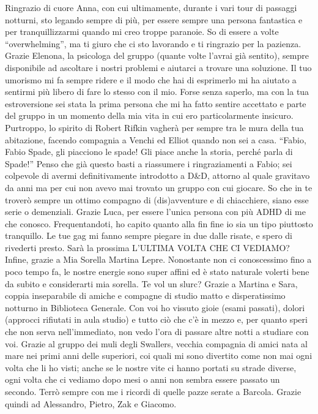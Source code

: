 \newline 
Ringrazio di cuore Anna, con cui ultimamente, durante i vari tour di passaggi notturni, sto legando sempre di più, per essere sempre una persona fantastica e per tranquillizzarmi quando mi creo troppe paranoie. So di essere a volte ``overwhelming'', ma ti giuro che ci sto lavorando e ti ringrazio per la pazienza.
\newline
Grazie Elenona, la psicologa del gruppo (quante volte l'avrai già sentito), sempre disponibile ad ascoltare i nostri problemi e aiutarci a trovare una soluzione. Il tuo umorismo mi fa sempre ridere e il modo che hai di esprimerlo mi ha aiutato a sentirmi più libero di fare lo stesso con il mio. Forse senza saperlo, ma con la tua estroversione sei stata la prima persona che mi ha fatto sentire accettato e parte del gruppo in un momento della mia vita in cui ero particolarmente insicuro. Purtroppo, lo spirito di Robert Rifkin vagherà per sempre tra le mura della tua abitazione, facendo compagnia a Venchi ed Elliot quando non sei a casa.
\newline
``Fabio, Fabio Spade, gli piacciono le spade! Gli piace anche la storia, perché parla di Spade!'' Penso che già questo basti a riassumere i ringraziamenti a Fabio; sei colpevole di avermi definitivamente introdotto a D\&D, attorno al quale gravitavo da anni ma per cui non avevo mai trovato un gruppo con cui giocare. So che in te troverò sempre un ottimo compagno di (dis)avventure e di chiacchiere, siano esse serie o demenziali.
\newline
Grazie Luca, per essere l'unica persona con più ADHD di me che conosco. Frequentandoti, ho capito quanto alla fin fine io sia un tipo piuttosto tranquillo. Le tue gag mi fanno sempre piegare in due dalle risate, e spero di rivederti presto. Sarà la prossima L'ULTIMA VOLTA CHE CI VEDIAMO?
\newline
Infine, grazie a Mia Sorella Martina Lepre. Nonostante non ci conoscessimo fino a poco tempo fa, le nostre energie sono super affini ed è stato naturale volerti bene da subito e considerarti mia sorella. Te vol un slurc?
\newline
Grazie a Martina e Sara, coppia inseparabile di amiche e compagne di studio matto e disperatissimo notturno in Biblioteca Generale. Con voi ho vissuto gioie (esami passati), dolori (approcci rifiutati in aula studio) e tutto ciò che c'è in mezzo e, per quanto speri che non serva nell'immediato, non vedo l'ora di passare altre notti a studiare con voi.
\newline
Grazie al gruppo dei muli degli Swallers, vecchia compagnia di amici nata al mare nei primi anni delle superiori, coi quali mi sono divertito come non mai ogni volta che li ho visti; anche se le nostre vite ci hanno portati su strade diverse, ogni volta che ci vediamo dopo mesi o anni non sembra essere passato un secondo. Terrò sempre con me i ricordi di quelle pazze serate a Barcola. Grazie quindi ad Alessandro, Pietro, Zak e Giacomo.
